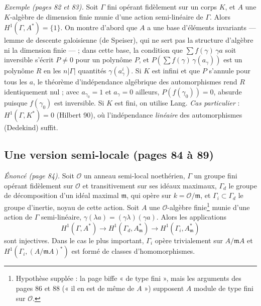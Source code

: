 \documentclass[11pt,a4paper]{article}
\begin{document}
\emph{Exemple (pages 82 et 83).} Soit $\Gamma$ fini opérant fidèlement sur un
corps $K$, et $A$ une $K$-algèbre de dimension finie munie d'une action
semi-linéaire de $\Gamma$. Alors $H^1(\Gamma, A^{*}) = \lbrace 1\rbrace$. On montre
d'abord que $A$ a une base d'éléments invariants — lemme de descente
galoisienne (de Speiser), qui ne sert pas la structure d'algèbre ni la
dimension finie — ; dans cette base, la condition que $\sum f(\gamma)\,\gamma a$
soit inversible s'écrit $P \neq 0$ pour un polynôme $P$, et $P(\sum
f(\gamma)\,\gamma(a_{\gamma}))$ est un polynôme $R$ en les $n|\Gamma|$ quantités
$\gamma(a^{i}_{\gamma})$. Si $K$ est infini et que $P$ s'annule pour tous les
$a$, le théorème d'indépendance algébrique des automorphismes rend $R$
identiquement nul ; avec $a_{\gamma_0} = 1$ et $a_{\gamma} = 0$ ailleurs, $P(f(\gamma_0))
= 0$, absurde puisque $f(\gamma_0)$ est inversible. Si $K$ est fini, on utilise
Lang. \emph{Cas particulier} : $H^1(\Gamma, K^{*}) = 0$ (Hilbert 90), où
l'indépendance \emph{linéaire} des automorphismes (Dedekind) suffit.

\subsection*{Une version semi-locale (pages 84 à 89)}

\emph{Énoncé (page 84).} Soit $\mathcal{O}$ un anneau semi-local noethérien,
$\Gamma$ un groupe fini opérant fidèlement sur $\mathcal{O}$ et transitivement
sur ses idéaux maximaux, $\Gamma_d$ le groupe de décomposition d'un idéal
maximal $\mathfrak{m}$, qui opère sur $k = \mathcal{O}/\mathfrak{m}$, et
$\Gamma_i \subset \Gamma_d$ le groupe d'inertie, noyau de cette action. Soit $A$
une $\mathcal{O}$-algèbre finie\footnote{Hypothèse supplée : la page biffe
« de type fini », mais les arguments des pages 86 et 88 (« il en est de même
de $A$ ») supposent $A$ module de type fini sur $\mathcal{O}$.} munie d'une
action de $\Gamma$ semi-linéaire, $\gamma(\lambda a) = (\gamma\lambda)(\gamma a)$.
Alors les applications
\[
H^1(\Gamma, A^{*}) \longrightarrow H^1(\Gamma_d, A_{\mathfrak{m}}^{*})
\longrightarrow H^1(\Gamma_i, A_{\mathfrak{m}}^{*})
\]
sont injectives. Dans le cas le plus important, $\Gamma_i$ opère trivialement
sur $A/\mathfrak{m}A$ et $H^1(\Gamma_i, (A/\mathfrak{m}A)^{*})$ est formé de
classes d'homomorphismes.
\end{document}
